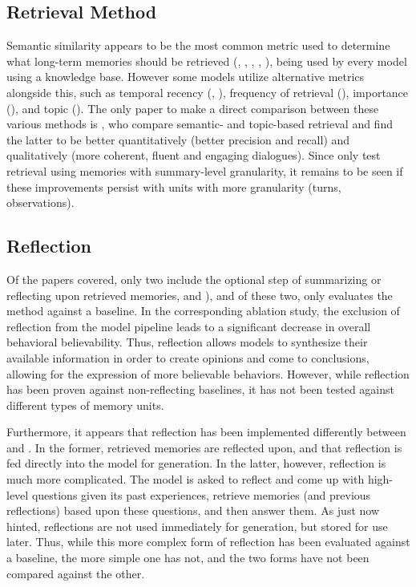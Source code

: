 \subsection{Retrieval Method}

Semantic similarity appears to be the most common metric used to determine what long-term memories should be retrieved (\cite{Hatalis2024}, \cite{Maharana2024}, \cite{Park2023}, \cite{Zhong2023}, \cite{Li2024}), being used by every model using a knowledge base. However some models utilize alternative metrics alongside this, such as temporal recency (\cite{Park2023}, \cite{Li2024}), frequency of retrieval (\cite{Zhong2023}), importance (\cite{Park2023}), and topic (\cite{Li2024}). The only paper to make a direct comparison between these various methods is \cite{Li2024}, who compare semantic- and topic-based retrieval and find the latter to be better quantitatively (better precision and recall) and qualitatively (more coherent, fluent and engaging dialogues). Since \cite{Li2024} only test retrieval using memories with summary-level granularity, it remains to be seen if these improvements persist with units with more granularity (turns, observations).


\subsection{Reflection}

Of the papers covered, only two include the optional step of summarizing or reflecting upon retrieved memories, \cite{Maharana2024} and \cite{Park2023}), and of these two, only \cite{Park2023} evaluates the method against a baseline. In the corresponding ablation study, the exclusion of reflection from the model pipeline leads to a significant decrease in overall behavioral believability. Thus, reflection allows models to synthesize their available information in order to create opinions and come to conclusions, allowing for the expression of more believable behaviors. However, while reflection has been proven against non-reflecting baselines, it has not been tested against different types of memory units. 
	
Furthermore, it appears that reflection has been implemented differently between \cite{Maharana2024} and \cite{Park2023}. In the former, retrieved memories are reflected upon, and that reflection is fed directly into the model for generation. In the latter, however, reflection is much more complicated. The model is asked to reflect and come up with high-level questions given its past experiences, retrieve memories (and previous reflections) based upon these questions, and then answer them. As just now hinted, reflections are not used immediately for generation, but stored for use later. Thus, while this more complex form of reflection has been evaluated against a baseline, the more simple one has not, and the two forms have not been compared against the other. 


